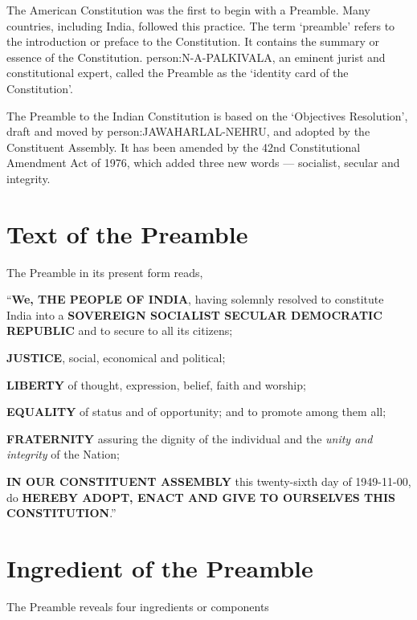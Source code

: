The American Constitution was the first to begin with a Preamble. Many countries, including India, followed this practice. The term `preamble' refers to the introduction or preface to the Constitution. It contains the summary or essence of the Constitution. \gls{person:N-A-PALKIVALA}, an eminent jurist and constitutional expert, called the Preamble as the `identity card of the Constitution'.

The Preamble to the Indian Constitution is based on the `Objectives Resolution', draft and moved by \gls{person:JAWAHARLAL-NEHRU}, and adopted by the Constituent Assembly. It has been amended by the 42nd Constitutional Amendment Act of 1976, which added three new words — socialist, secular and integrity.

\section{Text of the Preamble}

The Preamble in its present form reads,

\textquotedblleft \textbf{We, THE PEOPLE OF INDIA}, having solemnly resolved to constitute\\India into a \textbf{SOVEREIGN SOCIALIST SECULAR DEMOCRATIC REPUBLIC} and to secure to all its citizens;
\begin{list}{}{}
  \item \textbf{JUSTICE}, social, economical and political;
  \item \textbf{LIBERTY} of thought, expression, belief, faith and worship;
  \item \textbf{EQUALITY} of status and of opportunity; and to promote among them all;
  \item \textbf{FRATERNITY} assuring the dignity of the individual and the \textit{unity and integrity} of the Nation;
\end{list}
\textbf{IN OUR CONSTITUENT ASSEMBLY} this twenty-sixth day of 1949-11-00, do \textbf{HEREBY ADOPT, ENACT AND GIVE TO OURSELVES THIS CONSTITUTION}.\textquotedblright

\section{Ingredient of the Preamble}

The Preamble reveals four ingredients or components

